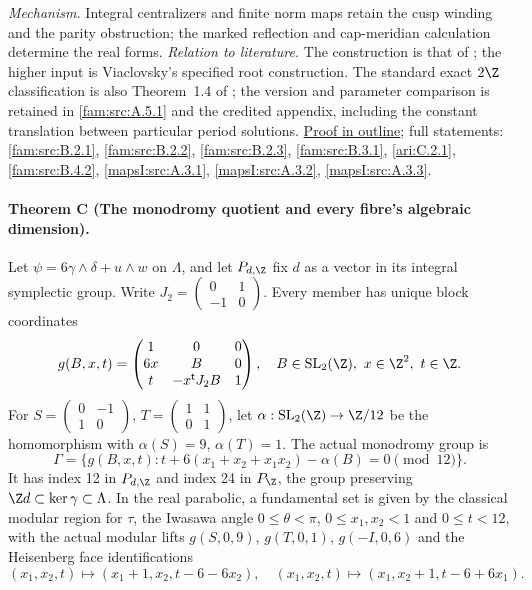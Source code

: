 \textit{Mechanism.} Integral centralizers and finite norm maps
retain the cusp winding and the parity obstruction; the marked
reflection and cap-meridian calculation determine the real forms.
\textit{Relation to literature.} The construction is that of
\cite{AC2026,Engel2026}; the higher input is Viaclovsky's specified
root construction.  The standard exact $2\Z$ classification is
also Theorem~1.4 of \cite{DuEtAl2026v1}; the version and parameter
comparison is retained in \ref{fam:src:A.5.1} and the credited
appendix, including the constant translation between particular
period solutions.
\hyperlink{outline-I-B}{Proof in outline}; full statements:
\ref{fam:src:B.2.1}, \ref{fam:src:B.2.2}, \ref{fam:src:B.2.3},
\ref{fam:src:B.3.1}, \ref{ari:C.2.1}, \ref{fam:src:B.4.2},
\ref{mapsI:src:A.3.1}, \ref{mapsI:src:A.3.2},
\ref{mapsI:src:A.3.3}.

\hypertarget{main-I-C}{}
\paragraph{Theorem C (The monodromy quotient and every fibre's algebraic dimension).}
\label{series:I:C}
Let $\psi=6\gamma\wedge\delta+u\wedge w$ on $\Lambda$, and
let $P_{d,\Z}$ fix $d$ as a vector in its integral symplectic
group.  Write $J_2=\left(\begin{smallmatrix}0&1\\-1&0\end{smallmatrix}\right)$.
Every member has unique block coordinates
\[
 g(B,x,t)=\begin{pmatrix}1&0&0\\6x&B&0\\
                   t&-x^{\mathsf t}J_2B&1\end{pmatrix},
 \quad B\in\operatorname{SL}_2(\Z),\ x\in\Z^2,\ t\in\Z.
\]
For $S=\left(\begin{smallmatrix}0&-1\\1&0\end{smallmatrix}\right)$,
$T=\left(\begin{smallmatrix}1&1\\0&1\end{smallmatrix}\right)$,
let $\alpha:\operatorname{SL}_2(\Z)\to\Z/12$ be the homomorphism
with $\alpha(S)=9$, $\alpha(T)=1$.  The actual monodromy group is
\[
 \Gamma=\{g(B,x,t):t+6(x_1+x_2+x_1x_2)-\alpha(B)=0\pmod{12}\}.
\]
It has index 12 in $P_{d,\Z}$ and index 24 in $P_\Z$, the group preserving
$\Z d\subset\ker\gamma\subset\Lambda$.  In the real parabolic,
a fundamental set is given by the classical modular region for
$\tau$, the Iwasawa angle $0\le\theta<\pi$,
$0\le x_1,x_2<1$ and $0\le t<12$, with the actual modular
lifts $g(S,0,9)$, $g(T,0,1)$, $g(-I,0,6)$ and the Heisenberg
face identifications
\[
 (x_1,x_2,t)\mapsto(x_1+1,x_2,t-6-6x_2),\quad
 (x_1,x_2,t)\mapsto(x_1,x_2+1,t-6+6x_1).
\]

